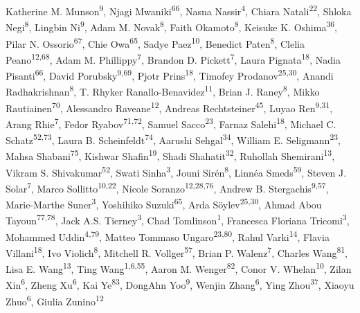 \documentclass[pdflatex,mathphys]{jnl}
\begin{document}
{Katherine M. Munson\textsuperscript{9}, Njagi Mwaniki\textsuperscript{66},
Nasna Nassir\textsuperscript{4}, Chiara Natali\textsuperscript{22}, Shloka Negi\textsuperscript{8},
Lingbin Ni\textsuperscript{9}, Adam M. Novak\textsuperscript{8}, Faith Okamoto\textsuperscript{8},
Keisuke K. Oshima\textsuperscript{36}, Pilar N. Ossorio\textsuperscript{67},
Chie Owa\textsuperscript{65}, Sadye Paez\textsuperscript{10}, Benedict Paten\textsuperscript{8},
Clelia Peano\textsuperscript{12,68}, Adam M. Phillippy\textsuperscript{7},
Brandon D. Pickett\textsuperscript{7}, Laura Pignata\textsuperscript{18},
Nadia Pisanti\textsuperscript{66}, David Porubsky\textsuperscript{9,69},
Pjotr Prins\textsuperscript{18}, Timofey Prodanov\textsuperscript{25,30},
Anandi Radhakrishnan\textsuperscript{8}, T. Rhyker Ranallo-Benavidez\textsuperscript{11},
Brian J. Raney\textsuperscript{8}, Mikko Rautiainen\textsuperscript{70},
Alessandro Raveane\textsuperscript{12}, Andreas Rechtsteiner\textsuperscript{45},
Luyao Ren\textsuperscript{9,31}, Arang Rhie\textsuperscript{7}, Fedor Ryabov\textsuperscript{71,72},
Samuel Sacco\textsuperscript{23}, Farnaz Salehi\textsuperscript{18},
Michael C. Schatz\textsuperscript{52,73}, Laura B. Scheinfeldt\textsuperscript{74},
Aarushi Sehgal\textsuperscript{34}, William E. Seligmann\textsuperscript{23},
Mahsa Shabani\textsuperscript{75}, Kishwar Shafin\textsuperscript{19},
Shadi Shahatit\textsuperscript{32}, Ruhollah Shemirani\textsuperscript{13},
Vikram S. Shivakumar\textsuperscript{52}, Swati Sinha\textsuperscript{3},
Jouni Sir\'en\textsuperscript{8}, Linn\'ea Smeds\textsuperscript{59}, Steven J. Solar\textsuperscript{7},
Marco Sollitto\textsuperscript{10,22}, Nicole Soranzo\textsuperscript{12,28,76},
Andrew B. Stergachis\textsuperscript{9,57}, Marie-Marthe Suner\textsuperscript{3},
Yoshihiko Suzuki\textsuperscript{65}, Arda S\"oylev\textsuperscript{25,30},
Ahmad Abou Tayoun\textsuperscript{77,78}, Jack A.S. Tierney\textsuperscript{3},
Chad Tomlinson\textsuperscript{1}, Francesca Floriana Tricomi\textsuperscript{3},
Mohammed Uddin\textsuperscript{4,79}, Matteo Tommaso Ungaro\textsuperscript{23,80},
Rahul Varki\textsuperscript{14}, Flavia Villani\textsuperscript{18}, Ivo Violich\textsuperscript{8},
Mitchell R. Vollger\textsuperscript{57}, Brian P. Walenz\textsuperscript{7},
Charles Wang\textsuperscript{81}, Lisa E. Wang\textsuperscript{13}, Ting Wang\textsuperscript{1,6,55},
Aaron M. Wenger\textsuperscript{82}, Conor V. Whelan\textsuperscript{10}, Zilan Xin\textsuperscript{6},
Zheng Xu\textsuperscript{6}, Kai Ye\textsuperscript{83}, DongAhn Yoo\textsuperscript{9},
Wenjin Zhang\textsuperscript{6}, Ying Zhou\textsuperscript{37}, Xiaoyu Zhuo\textsuperscript{6},
Giulia Zunino\textsuperscript{12}\par
}
\end{document}

